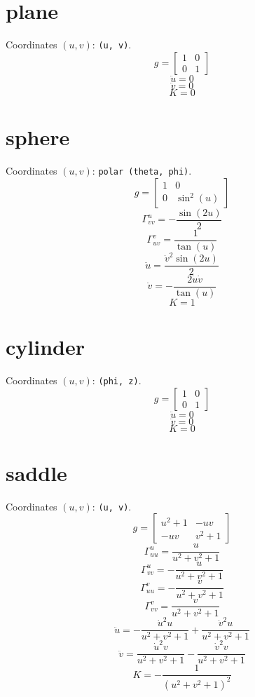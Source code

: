 \documentclass{article}
\begin{document}
\section*{plane}
Coordinates $(u, v)$: \texttt{(u, v)}.
\[ g = \left[\begin{matrix}1 & 0\\0 & 1\end{matrix}\right] \]
\[ \ddot{u} = 0 \]
\[ \ddot{v} = 0 \]
\[ K = 0 \]

\section*{sphere}
Coordinates $(u, v)$: \texttt{polar (theta, phi)}.
\[ g = \left[\begin{matrix}1 & 0\\0 & \sin^{2}{\left(u \right)}\end{matrix}\right] \]
\[ \Gamma^{u}_{vv} = - \frac{\sin{\left(2 u \right)}}{2} \]
\[ \Gamma^{v}_{uv} = \frac{1}{\tan{\left(u \right)}} \]
\[ \ddot{u} = \frac{\dot{v}^{2} \sin{\left(2 u \right)}}{2} \]
\[ \ddot{v} = - \frac{2 \dot{u} \dot{v}}{\tan{\left(u \right)}} \]
\[ K = 1 \]

\section*{cylinder}
Coordinates $(u, v)$: \texttt{(phi, z)}.
\[ g = \left[\begin{matrix}1 & 0\\0 & 1\end{matrix}\right] \]
\[ \ddot{u} = 0 \]
\[ \ddot{v} = 0 \]
\[ K = 0 \]

\section*{saddle}
Coordinates $(u, v)$: \texttt{(u, v)}.
\[ g = \left[\begin{matrix}u^{2} + 1 & - u v\\- u v & v^{2} + 1\end{matrix}\right] \]
\[ \Gamma^{u}_{uu} = \frac{u}{u^{2} + v^{2} + 1} \]
\[ \Gamma^{u}_{vv} = - \frac{u}{u^{2} + v^{2} + 1} \]
\[ \Gamma^{v}_{uu} = - \frac{v}{u^{2} + v^{2} + 1} \]
\[ \Gamma^{v}_{vv} = \frac{v}{u^{2} + v^{2} + 1} \]
\[ \ddot{u} = - \frac{\dot{u}^{2} u}{u^{2} + v^{2} + 1} + \frac{\dot{v}^{2} u}{u^{2} + v^{2} + 1} \]
\[ \ddot{v} = \frac{\dot{u}^{2} v}{u^{2} + v^{2} + 1} - \frac{\dot{v}^{2} v}{u^{2} + v^{2} + 1} \]
\[ K = - \frac{1}{\left(u^{2} + v^{2} + 1\right)^{2}} \]
\end{document}
